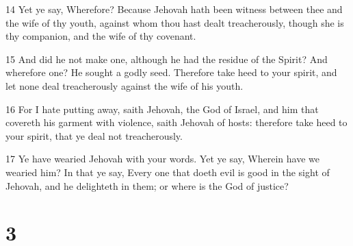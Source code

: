 \par 14 Yet ye say, Wherefore? Because Jehovah hath been witness between thee and the wife of thy youth, against whom thou hast dealt treacherously, though she is thy companion, and the wife of thy covenant.
\par 15 And did he not make one, although he had the residue of the Spirit? And wherefore one? He sought a godly seed. Therefore take heed to your spirit, and let none deal treacherously against the wife of his youth.
\par 16 For I hate putting away, saith Jehovah, the God of Israel, and him that covereth his garment with violence, saith Jehovah of hosts: therefore take heed to your spirit, that ye deal not treacherously.
\par 17 Ye have wearied Jehovah with your words. Yet ye say, Wherein have we wearied him? In that ye say, Every one that doeth evil is good in the sight of Jehovah, and he delighteth in them; or where is the God of justice?

\chapter{3}

